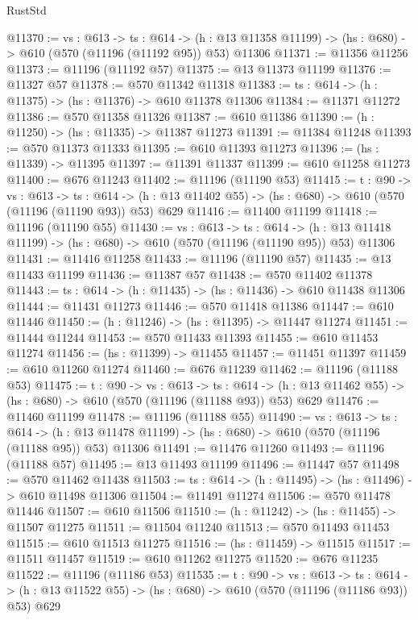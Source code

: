 \begin{lexlean}{RustStd}
\begin{coremodule}
@11370 := {vs : @613} ->
  {ts : @614} ->
  (h : @13 @11358 @11199) -> (hs : @680) -> @610 (@570 (@11196 (@11192 @95)) @53) @11306
@11371 := @11356 @11256
@11373 := @11196 (@11192 @57)
@11375 := @13 @11373 @11199
@11376 := @11327 @57
@11378 := @570 @11342 @11318
@11383 := {ts : @614} -> (h : @11375) -> (hs : @11376) -> @610 @11378 @11306
@11384 := @11371 @11272
@11386 := @570 @11358 @11326
@11387 := @610 @11386
@11390 := (h : @11250) -> (hs : @11335) -> @11387 @11273
@11391 := @11384 @11248
@11393 := @570 @11373 @11333
@11395 := @610 @11393 @11273
@11396 := (hs : @11339) -> @11395
@11397 := @11391 @11337
@11399 := @610 @11258 @11273
@11400 := @676 @11243
@11402 := @11196 (@11190 @53)
@11415 := {t : @90} ->
  {vs : @613} ->
  {ts : @614} -> (h : @13 @11402 @55) -> (hs : @680) -> @610 (@570 (@11196 (@11190 @93)) @53) @629
@11416 := @11400 @11199
@11418 := @11196 (@11190 @55)
@11430 := {vs : @613} ->
  {ts : @614} ->
  (h : @13 @11418 @11199) -> (hs : @680) -> @610 (@570 (@11196 (@11190 @95)) @53) @11306
@11431 := @11416 @11258
@11433 := @11196 (@11190 @57)
@11435 := @13 @11433 @11199
@11436 := @11387 @57
@11438 := @570 @11402 @11378
@11443 := {ts : @614} -> (h : @11435) -> (hs : @11436) -> @610 @11438 @11306
@11444 := @11431 @11273
@11446 := @570 @11418 @11386
@11447 := @610 @11446
@11450 := (h : @11246) -> (hs : @11395) -> @11447 @11274
@11451 := @11444 @11244
@11453 := @570 @11433 @11393
@11455 := @610 @11453 @11274
@11456 := (hs : @11399) -> @11455
@11457 := @11451 @11397
@11459 := @610 @11260 @11274
@11460 := @676 @11239
@11462 := @11196 (@11188 @53)
@11475 := {t : @90} ->
  {vs : @613} ->
  {ts : @614} -> (h : @13 @11462 @55) -> (hs : @680) -> @610 (@570 (@11196 (@11188 @93)) @53) @629
@11476 := @11460 @11199
@11478 := @11196 (@11188 @55)
@11490 := {vs : @613} ->
  {ts : @614} ->
  (h : @13 @11478 @11199) -> (hs : @680) -> @610 (@570 (@11196 (@11188 @95)) @53) @11306
@11491 := @11476 @11260
@11493 := @11196 (@11188 @57)
@11495 := @13 @11493 @11199
@11496 := @11447 @57
@11498 := @570 @11462 @11438
@11503 := {ts : @614} -> (h : @11495) -> (hs : @11496) -> @610 @11498 @11306
@11504 := @11491 @11274
@11506 := @570 @11478 @11446
@11507 := @610 @11506
@11510 := (h : @11242) -> (hs : @11455) -> @11507 @11275
@11511 := @11504 @11240
@11513 := @570 @11493 @11453
@11515 := @610 @11513 @11275
@11516 := (hs : @11459) -> @11515
@11517 := @11511 @11457
@11519 := @610 @11262 @11275
@11520 := @676 @11235
@11522 := @11196 (@11186 @53)
@11535 := {t : @90} ->
  {vs : @613} ->
  {ts : @614} -> (h : @13 @11522 @55) -> (hs : @680) -> @610 (@570 (@11196 (@11186 @93)) @53) @629

\end{coremodule}
\end{lexlean}
